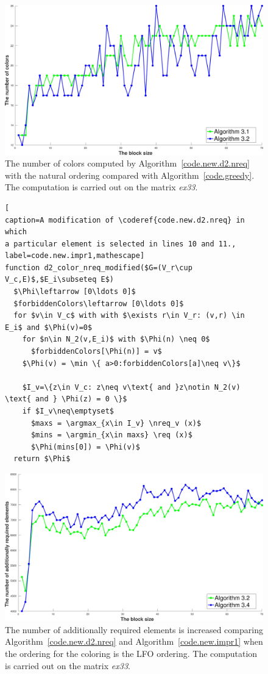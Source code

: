\documentclass[12pt, twoside,a4paper,toc=bibliography]{scrbook}
\DeclareMathOperator*{\argmin}{arg\,min}
\DeclareMathOperator*{\argmax}{arg\,max}
\newcommand{\coderef}[1]{Algorithm~\protect\ref{#1}}
\newcommand{\nreq}{L}
\newcommand{\req}{M}
\begin{document}
\begin{figure}
\centering
\includegraphics[width=0.9\linewidth]{ex33_alg31_alg32_bls_nat_cols}
\caption{The number of colors computed by \coderef{code.new.d2.nreq} with the natural ordering
compared with \coderef{code.greedy}.
The computation is carried out on the matrix \textit{ex33}. }
\label{ex33_alg31_alg32_bls_nat_cols}
\end{figure}

\begin{figure}
\begin{lstlisting}[
caption=A modification of \coderef{code.new.d2.nreq} in which
a particular element is selected in lines 10 and 11.,
label=code.new.impr1,mathescape]
function d2_color_nreq_modified($G=(V_r\cup V_c,E)$,$E_i\subseteq E$)
  $\Phi\leftarrow [0\ldots 0]$
  $forbiddenColors\leftarrow [0\ldots 0]$
  for $v\in V_c$ with with $\exists r\in V_r: (v,r) \in E_i$ and $\Phi(v)=0$
    for $n\in N_2(v,E_i)$ with $\Phi(n) \neq 0$
      $forbiddenColors[\Phi(n)] = v$
    $\Phi(v) = \min \{ a>0:forbiddenColors[a]\neq v\}$

    $I_v=\{z\in V_c: z\neq v\text{ and }z\notin N_2(v) \text{ and } \Phi(z) = 0 \}$
    if $I_v\neq\emptyset$
      $maxs = \argmax_{x\in I_v} \nreq_v (x)$
      $mins = \argmin_{x\in maxs} \req (x)$
      $\Phi(mins[0]) = \Phi(v)$
  return $\Phi$
\end{lstlisting}
\end{figure}

\begin{figure}
\centering
\includegraphics[width=0.9\linewidth]{ex33_alg32_alg34_bls_lfo_add}
\caption{The number of additionally
required elements is increased comparing \coderef{code.new.d2.nreq}
and \coderef{code.new.impr1} when the ordering for the coloring is the LFO ordering.
The computation is carried out on the matrix \textit{ex33}. }
\label{ex33_alg32_alg34_bls_lfo_add}
\end{figure}
\end{document}
